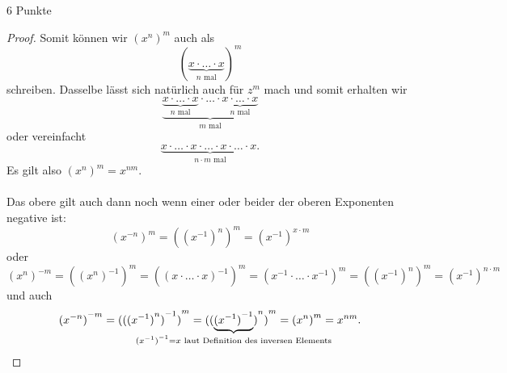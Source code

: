 \documentclass{problemset}
\begin{document}
\begin{problem}{6 Punkte}
\begin{proof}
    Somit können wir ${(x^n)}^m$ auch als \[
        (\underbrace{x \cdot \ldots \cdot x}_{n\text{ mal}})^m
    \] schreiben. Dasselbe lässt sich natürlich auch für $z^m$ mach und somit
       erhalten wir \[
        \underbrace{
            \underbrace{
                x \cdot \ldots \cdot x
            }_{n\text{ mal}
                } \cdot \ldots \cdot \underbrace{
                x \cdot \ldots \cdot x
            }_{n\text{ mal}}
        }_{m\text{ mal}}
    \] oder vereinfacht \[
        \underbrace{
            x \cdot \ldots \cdot x \cdot \ldots \cdot x \cdot \ldots \cdot x.
        }_{n \cdot m\text{ mal}}
    \]
    Es gilt also ${(x^n)}^m = x^{nm}$. \\ \\ Das obere gilt auch dann noch wenn
    einer oder beider der oberen Exponenten negative ist: \[
        {(x^{-n})}^m = {({(x^{-1})}^n)}^m = {(x^{-1})}^{x \cdot m}
    \] oder \[
        {(x^{n})}^{-m} = {({(x^n)}^{-1})}^m = {({(x \cdot \ldots \cdot x)}^{-1})}^m = {(x^{-1} \cdot \ldots \cdot x^{-1})}^m = {({(x^{-1})}^n)}^m = {(x^{-1})}^{n \cdot m}
    \] und auch \[
        {(x^{-n})}^{-m} = {({({(x^{-1})}^n)}^{-1})}^m = {({(\underbrace{{(x^{-1})}^{-1}}_{\mathclap{{(x^{-1})}^{-1} = x \text{ laut Definition des inversen Elements}}})}^n)}^m = {({x}^n)}^m = x^{nm}.
    \]
\end{proof}
\end{problem}
\end{document}
